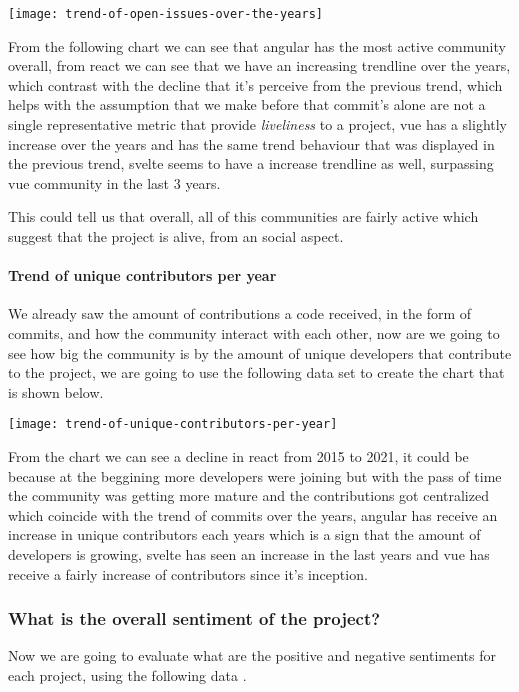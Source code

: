 \begin{center}
    \texttt{[image: trend-of-open-issues-over-the-years]}    
\end{center}

From the following chart we can see that angular has the most active community overall, from react we can see that we have an increasing trendline over the years, which contrast with the decline that it's perceive from the previous trend, which helps with the assumption that we make before that commit's alone are not a single representative metric that provide \textit{liveliness} to a project, vue has a slightly increase over the years and has the same trend behaviour that was displayed in the previous trend, svelte seems to have a increase trendline as well, surpassing vue community in the last 3 years.

This could tell us that overall, all of this communities are fairly active which suggest that the project is alive, from an social aspect.

\paragraph{Trend of unique contributors per year}
We already saw the amount of contributions a code received, in the form of commits, and how the community interact with each other, now are we going to see how big the community is by the amount of unique developers that contribute to the project, we are going to use the following data set\cite{trend-of-unique-contributors-per-year} to create the chart that is shown below.

\begin{center}
    \texttt{[image: trend-of-unique-contributors-per-year]}    
\end{center}

From the chart we can see a decline in react from 2015 to 2021, it could be because at the beggining more developers were joining but with the pass of time the community was getting more mature and the contributions got centralized which coincide with the trend of commits over the years, angular has receive an increase in unique contributors each years which is a sign that the amount of developers is growing, svelte has seen an increase in the last years and vue has receive a fairly increase of contributors since it's inception.

\subsubsection{What is the overall sentiment of the project?}
Now we are going to evaluate what are the positive and negative sentiments for each project, using the following data \cite{overall-sentiment}.


